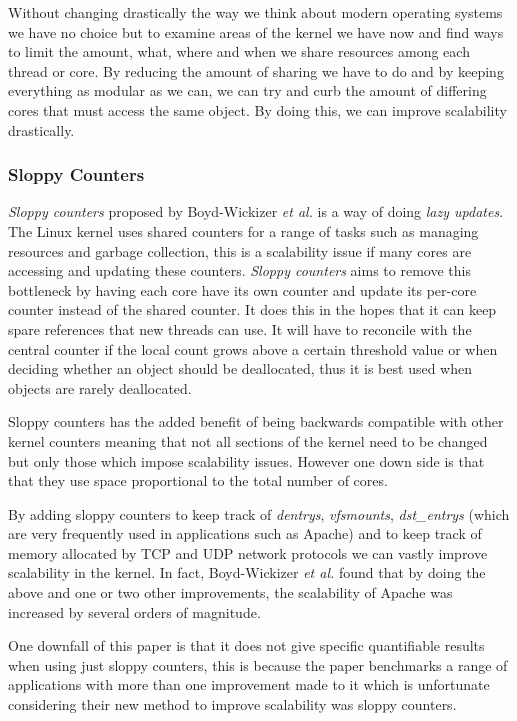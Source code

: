 \documentclass[journal]{IEEEtran}
\begin{document}
Without changing drastically the way we think about modern operating systems we have no choice but to examine areas of the kernel we have now and find ways to limit the amount, what, where and when we share resources among each thread or core. By reducing the amount of sharing we have to do and by keeping everything as modular as we can, we can try and curb the amount of differing cores that must access the same object. By doing this, we can improve scalability drastically. 

\subsubsection{Sloppy Counters}
\emph{Sloppy counters} proposed by Boyd-Wickizer \emph{et al.} is a way of doing \emph{lazy updates}. The Linux kernel uses shared counters for a range of tasks such as managing resources and garbage collection, this is a scalability issue if many cores are accessing and updating these counters. \emph{Sloppy counters} aims to remove this bottleneck by having each core have its own counter and update its per-core counter instead of the shared counter. It does this in the hopes that it can keep spare references that new threads can use. It will have to reconcile with the central counter if the local count grows above a certain threshold value or when deciding whether an object should be deallocated, thus it is best used when objects are rarely deallocated.  

Sloppy counters has the added benefit of being backwards compatible with other kernel counters meaning that not all sections of the kernel need to be changed but only those which impose scalability issues. However one down side is that that they use space proportional to the total number of cores.

By adding sloppy counters to keep track of \emph{dentrys}, \emph{vfsmounts}, \emph{dst\_entrys} (which are very frequently used in applications such as Apache) and to keep track of memory allocated by TCP and UDP network protocols we can vastly improve scalability in the kernel. In fact, Boyd-Wickizer \emph{et al.} found that by doing the above and one or two other improvements, the scalability of Apache was increased by several orders of magnitude. \cite{sloppy-counters}

One downfall of this paper \cite{sloppy-counters} is that it does not give specific quantifiable results when using just sloppy counters, this is because the paper benchmarks a range of applications with more than one improvement made to it which is unfortunate considering their new method to improve scalability was sloppy counters.
\end{document}
